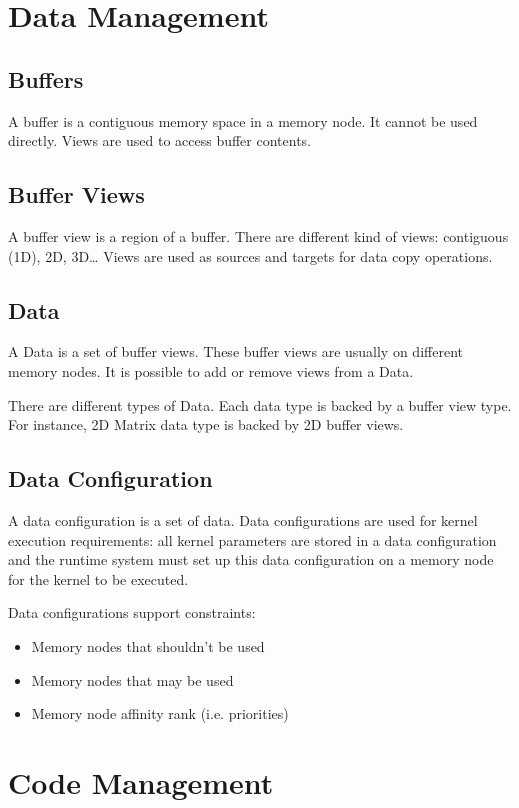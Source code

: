 \section{Data Management}

\subsection{Buffers}
A buffer is a contiguous memory space in a memory node.
It cannot be used directly. 
Views are used to access buffer contents.

\subsection{Buffer Views}
A buffer view is a region of a buffer.
There are different kind of views: contiguous (1D), 2D, 3D\ldots
Views are used as sources and targets for data copy operations.

\subsection{Data}
A Data is a set of buffer views.
These buffer views are usually on different memory nodes.
It is possible to add or remove views from a Data.

There are different types of Data.
Each data type is backed by a buffer view type.
For instance, 2D Matrix data type is backed by 2D buffer views.

\subsection{Data Configuration}
A data configuration is a set of data.
Data configurations are used for kernel execution requirements:
all kernel parameters are stored in a data configuration and the runtime system must set up this data configuration on a memory node for the kernel to be executed.

Data configurations support constraints:
\begin{itemize}
  \item Memory nodes that shouldn't be used
  \item Memory nodes that may be used
  \item Memory node affinity rank (i.e. priorities)
\end{itemize}

\section{Code Management}

